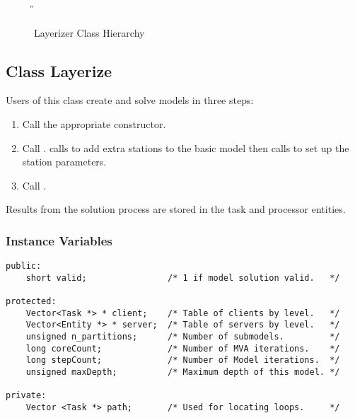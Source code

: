 \begin{figure}[htbp]
  \label{fig:layerize}
  \begin{center}
    \T \tex \leavevmode 
    \caption{Layerizer Class Hierarchy}
    \H {}
  \end{center}
\end{figure}

\htmlrule
\subsection{Class Layerize}

Users of this class create and solve models in three steps:
\begin{enumerate}
\item Call the appropriate constructor.
\item Call .
   calls
   to add extra stations
  to the basic model then calls
   to set up the
  station parameters.
\item Call .
\end{enumerate}
Results from the solution process are stored in the task and processor
entities. 

\subsubsection{Instance Variables}
\label{sec:layerize-ivars}

\begin{verbatim}
public:
    short valid;                /* 1 if model solution valid.   */

protected:
    Vector<Task *> * client;    /* Table of clients by level.   */
    Vector<Entity *> * server;  /* Table of servers by level.   */
    unsigned n_partitions;      /* Number of submodels.         */
    long coreCount;             /* Number of MVA iterations.    */
    long stepCount;             /* Number of Model iterations.  */
    unsigned maxDepth;          /* Maximum depth of this model. */

private:
    Vector <Task *> path;       /* Used for locating loops.     */
\end{verbatim}

